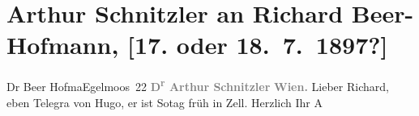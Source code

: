 

         
         \renewcommand{\erwaehntePersonen}{Personen: Richard Beer-Hofmann, Hugo von Hofmannsthal}
         \renewcommand{\erwaehnteOrte}{Orte: Bad Ischl, Eglmoosgasse, Wien, Zell am See}
         \renewcommand{\erwaehnteWerke}{}
               \section[Arthur Schnitzler an Richard Beer-Hofmann, {[}17. oder 18. 7. 1897?{]}]{ Arthur Schnitzler an Richard Beer-Hofmann, {[}17. oder
               18. 7. 1897?{]}}\nopagebreak{}\rehead{ }\begin{ledgroupsized}[t]{13cm}\normalsize\beginnumbering \toendnotes[C]{\smallbreak\pagebreak[2]} 
\pstart{}{\pb}Dr Beer Hofma{\geminationn}\pend{}\pstart{}Egelmoos 22\pend{}{\bigskip}\pstart
           \noindent{}\centering{}{\pb}\textcolor{gray}{\textbf{D\textsuperscript{r} Arthur Schnitzler}}\pend
           \pstart
           \noindent{}\raggedleft{}\textcolor{gray}{\textbf{Wien.}}\pend
           \pstart
           \noindent{}{\pb}Lieber Richard, eben Telegra{\geminationm} von Hugo, er
               ist So{\geminationn}tag früh in Zell.\pend
           \pstart Herzlich Ihr \spacefill\mbox{A}\pend{}
         
         \endnumbering{}\end{ledgroupsized}  \newcommand{\dateiname}{L00704}\newcommand{\titel}{Arthur Schnitzler an Richard Beer-Hofmann, [17. oder 18. 7. 1897?]}\newcommand{\editorInnen}{Martin Anton Müller und Gerd-Hermann Susen}
      